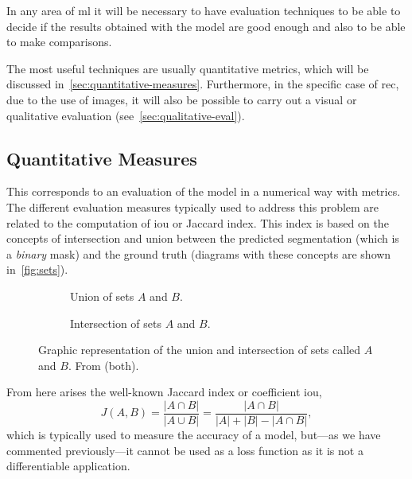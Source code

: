 In any area of \gls{ml} it will be necessary to have evaluation techniques to
be able to decide if the results obtained with the model are good enough and
also to be able to make comparisons.

The most useful techniques are usually quantitative metrics, which will be
discussed in\ \vref{sec:quantitative-measures}. Furthermore, in the specific
case of \gls{rec}, due to the use of images, it will also be possible to carry
out a visual or qualitative evaluation (see\ \vref{sec:qualitative-eval}).


\subsection{Quantitative Measures}\label{sec:quantitative-measures}

This corresponds to an evaluation of the model in a numerical way with
metrics. The different evaluation measures typically used to address this
problem are related to the computation of \gls{iou} or Jaccard
index. This index is based on the concepts of intersection
and union between the predicted segmentation (which is a \emph{binary} mask)
and the ground truth (diagrams with these concepts are shown in\
\vref{fig:sets}).

\begin{figure}[ht]
  \begin{subfigure}[t]{.5\textwidth}
    \centering
    \caption{Union of sets \(A\) and \(B\).}
    
  \end{subfigure}\hfill
  \begin{subfigure}[t]{.5\textwidth}
    \centering
    \caption{Intersection of sets \(A\) and \(B\).}
    
  \end{subfigure}
  \caption[Union and intersection of sets \(A\) and \(B\)]{Graphic
    representation of the union and intersection of sets called \(A\) and
    \(B\). From \figcite{contributors21:jaccar} (both).}%
  \label{fig:sets}
\end{figure}

From here arises the well-known Jaccard index or
coefficient \gls{iou},
\begin{equation}
  J(A,B) = \frac{|A \cap B|}{|A \cup B|} =
  \frac{|A \cap B|}{|A| + |B| - |A \cap B|},
\end{equation}
which is typically used to measure the accuracy of a model, but---as we have
commented previously---it cannot be used as a loss function as it is not a
differentiable application.

